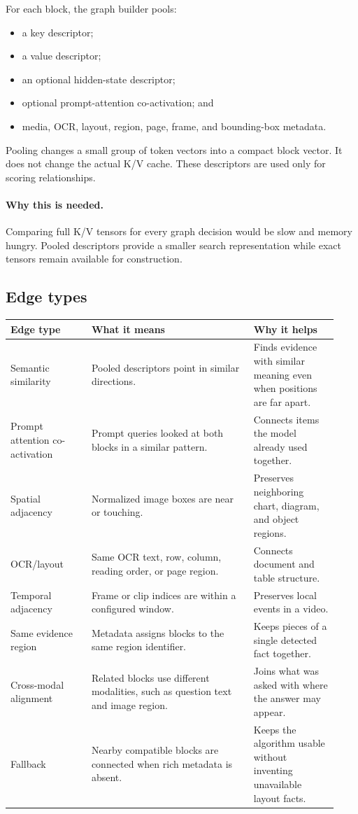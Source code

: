 \documentclass[11pt]{article}
\newcommand{\why}{\paragraph{Why this is needed.}}
\begin{document}
For each block, the graph builder pools:

\begin{itemize}
  \item a key descriptor;
  \item a value descriptor;
  \item an optional hidden-state descriptor;
  \item optional prompt-attention co-activation; and
  \item media, OCR, layout, region, page, frame, and bounding-box metadata.
\end{itemize}

Pooling changes a small group of token vectors into a compact block vector. It does not change the
actual K/V cache. These descriptors are used only for scoring relationships.

\why Comparing full K/V tensors for every graph decision would be slow and memory hungry. Pooled
descriptors provide a smaller search representation while exact tensors remain available for
construction.

\subsection{Edge types}

\begin{longtable}{>{\raggedright\arraybackslash}p{0.23\linewidth}p{0.46\linewidth}p{0.24\linewidth}}
\toprule
Edge type & What it means & Why it helps \\
\midrule
\endhead
Semantic similarity & Pooled descriptors point in similar directions. & Finds evidence with
similar meaning even when positions are far apart. \\
Prompt attention co-activation & Prompt queries looked at both blocks in a similar pattern. &
Connects items the model already used together. \\
Spatial adjacency & Normalized image boxes are near or touching. & Preserves neighboring chart,
diagram, and object regions. \\
OCR/layout & Same OCR text, row, column, reading order, or page region. & Connects document and
table structure. \\
Temporal adjacency & Frame or clip indices are within a configured window. & Preserves local
events in a video. \\
Same evidence region & Metadata assigns blocks to the same region identifier. & Keeps pieces of a
single detected fact together. \\
Cross-modal alignment & Related blocks use different modalities, such as question text and image
region. & Joins what was asked with where the answer may appear. \\
Fallback & Nearby compatible blocks are connected when rich metadata is absent. & Keeps the
algorithm usable without inventing unavailable layout facts. \\
\bottomrule
\end{longtable}
\end{document}
